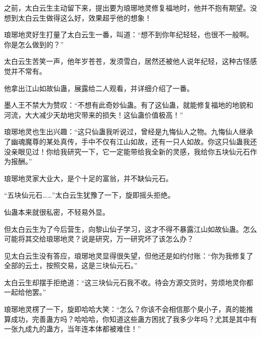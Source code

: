 \begin{this_body}
之前，太白云生主动留下来，提出要为琅琊地灵修复福地时，他并不抱有期望。没想到太白云生做得这么好，效果超乎他的想象！

琅琊地灵好生打量了太白云生一番，叫道：“想不到你年纪轻轻，也很不一般啊。你是怎么做到的？”

太白云生苦笑一声，他年岁苍苍，发须雪白，居然还被他人说年纪轻，这种古怪感觉并不常有。

他拿出江山如故仙蛊，展露给二人观看，并详细介绍了一番。

墨人王不禁大为赞叹：“不想有此奇妙仙蛊。有了这仙蛊，就能修复福地的地貌和河流，大大减少天劫地灾带来的损失！这仙蛊价值极高！”

琅琊地灵也生出兴趣：“这只仙蛊我听说过，曾经是九悔仙人之物。九悔仙人继承了幽魂魔尊的某处真传，手中不仅有江山如故，还有一只人如故。你这只仙蛊我还没亲眼见过！你给我研究一下，它一定能带给我全新的灵感，我给你五块仙元石作为报酬。”

琅琊地灵家大业大，是个十足的富翁，并不缺仙元石。

“五块仙元石……”太白云生犹豫了一下，旋即摇头拒绝。

仙蛊本来就很私密，不轻易外显。

但太白云生为了今后营生，向黎山仙子学习，这才不得不暴露江山如故仙蛊。怎么可能将其交给琅琊地灵？说是研究，万一研究坏了该怎么办？

见太白云生没有答应，琅琊地灵显得很失望，但他还是如约付账：“你为我修复了全部的云土，按照交易，这是三块仙元石。”

太白云生却摆手拒绝道：“这三块仙元石我不收。待会方源交货时，劳烦地灵你都一起给他罢。”

琅琊地灵楞了一下，旋即哈哈大笑：“怎么？你该不会相信那个臭小子，真的能推算成功，完善蛊方吗？哈哈哈，你知道这些蛊方困扰了我多少年吗？尤其是其中有一张九成九的蛊方，当年连本体都被难住！”

\end{this_body}


